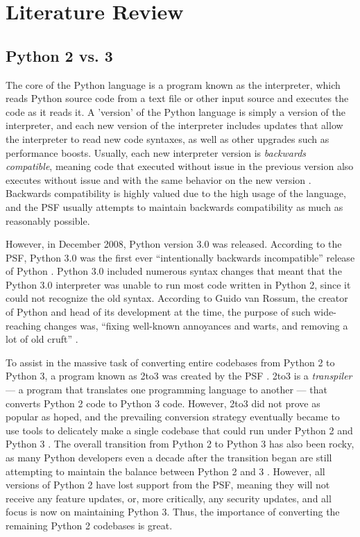 \section{Literature Review}

\subsection{Python 2 vs. 3}
The core of the Python language is a program known as the interpreter, which reads Python source code from a text file or other input source and executes the code as it reads it. A 'version' of the Python language is simply a version of the interpreter, and each new version of the interpreter includes updates that allow the interpreter to read new code syntaxes, as well as other upgrades such as performance boosts. Usually, each new interpreter version is \textit{backwards compatible}, meaning code that executed without issue in the previous version also executes without issue and with the same behavior on the new version \autocite{Malloy}. Backwards compatibility is highly valued due to the high usage of the language, and the PSF usually attempts to maintain backwards compatibility as much as reasonably possible.

However, in December 2008, Python version 3.0 was released. According to the PSF, Python 3.0 was the first ever “intentionally backwards incompatible” release of Python \autocite{vanRossum}. Python 3.0 included numerous syntax changes that meant that the Python 3.0 interpreter was unable to run most code written in Python 2, since it could not recognize the old syntax. According to Guido van Rossum, the creator of Python and head of its development at the time, the purpose of such wide-reaching changes was, “fixing well-known annoyances and warts, and removing a lot of old cruft” \autocite{vanRossum}.

To assist in the massive task of converting entire codebases from Python 2 to Python 3, a program known as 2to3 was created by the PSF \autocite{2to3}. 2to3 is a \textit{transpiler} --- a program that translates one programming language to another --- that converts Python 2 code to Python 3 code. However, 2to3 did not prove as popular as hoped, and the prevailing conversion strategy eventually became to use tools to delicately make a single codebase that could run under Python 2 and Python 3 \autocite{Malloy}. The overall transition from Python 2 to Python 3 has also been rocky, as many Python developers even a decade after the transition began are still attempting to maintain the balance between Python 2 and 3 \autocite{Malloy}. However, all versions of Python 2 have lost support from the PSF, meaning they will not receive any feature updates, or, more critically, any security updates, and all focus is now on maintaining Python 3. Thus, the importance of converting the remaining Python 2 codebases is great.

